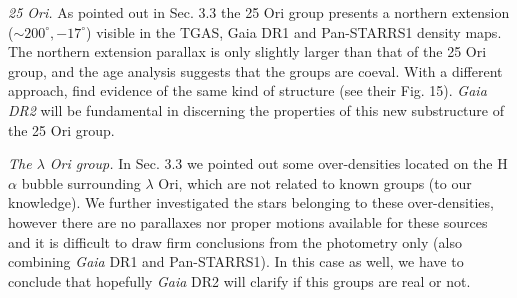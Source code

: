 \documentclass[onecolumn]{aa} %
\begin{document}
\textit{25 Ori.} As pointed out in Sec. 3.3 the 25 Ori group presents a northern extension ($\sim 200^{\circ},-17^{\circ}$) visible in the TGAS, Gaia DR1 and Pan-STARRS1 density maps. The northern extension parallax is only slightly larger than that of the 25 Ori group, and the age analysis suggests that the groups are coeval. With a different approach, \cite{Lombardi2017} find evidence of the same kind of structure (see their Fig. 15). \textit{Gaia DR2} will be fundamental in discerning the properties of this new substructure of the 25 Ori group.

\textit{The $\lambda$ Ori group.} In Sec. 3.3 we pointed out some over-densities located on the H$\alpha$ bubble surrounding $\lambda$ Ori, which are not related to known groups (to our knowledge). We further investigated the stars belonging to these over-densities, however there are no parallaxes nor proper motions available for these sources and it is difficult to draw firm conclusions from the photometry only (also combining \textit{Gaia} DR1 and Pan-STARRS1). In this case as well, we have to conclude that hopefully \textit{Gaia} DR2 will clarify if this groups are real or not.
\end{document}
